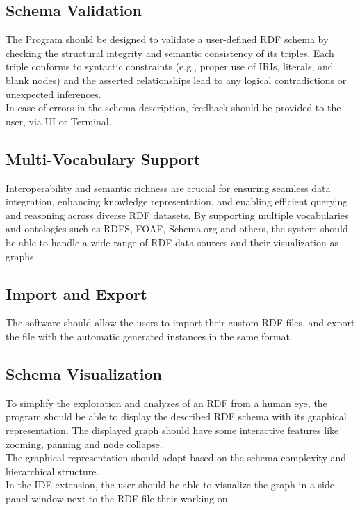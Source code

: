 \subsection{Schema Validation\label{sec:reqsuba}}
The Program should be designed to validate a user-defined RDF schema by checking the structural integrity and semantic consistency of its triples. 
Each triple conforms to syntactic constraints (e.g., proper use of IRIs, literals, and blank nodes) and the asserted relationships lead to any logical contradictions or unexpected inferences.
\\
In case of errors in the schema description, feedback should be provided to the user, via UI or Terminal.

\subsection{Multi-Vocabulary Support\label{sec:reqsuba}}
Interoperability and semantic richness are crucial for ensuring seamless data integration, enhancing knowledge representation, and enabling efficient querying and reasoning across diverse RDF datasets.
By supporting multiple vocabularies and ontologies such as RDFS, FOAF, Schema.org and others, the system should be able to handle a wide range of RDF data sources and their visualization as graphs.

\subsection{Import and Export\label{sec:reqsuba}}
The software should allow the users to import their custom RDF files, and export the file with the automatic generated instances in the same format.

\subsection{Schema Visualization\label{sec:reqsuba}}
To simplify the exploration and analyzes of an RDF from a human eye, the program should be able to display the described RDF schema with its graphical representation.
The displayed graph should have some interactive features like zooming, panning and node collapse.
\\
The graphical representation should adapt based on the schema complexity and hierarchical structure.
\\
In the IDE  extension, the user should be able to visualize the graph in a side panel window next to the RDF file their working on. 

